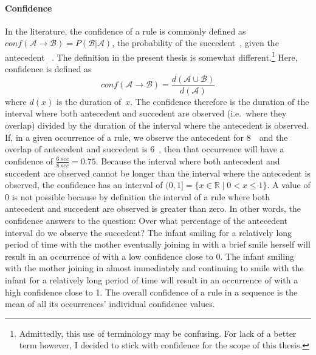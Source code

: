 \paragraph{Confidence}
In the literature, the confidence of a rule  is commonly defined as \(conf(\mathcal{A\rightarrow B}) = P(\mathcal{B|A})\), the probability of the succedent~, given the antecedent~ \citep[]{han_data_2012}.
The definition in the present thesis is somewhat different.\footnote{%
Admittedly, this use of terminology may be confusing. For lack of a better term however, I decided to stick with confidence for the scope of this thesis.}
Here, confidence is defined as
\[conf(\mathcal{A \rightarrow B}) = \frac{d(\mathcal{A \cup B})}{d(\mathcal{A})}\]
where \(d(x)\) is the duration of~\(x\).
The confidence therefore is the duration of the interval where both antecedent and succedent are observed (i.e.~where they overlap) divided by the duration of the interval where the antecedent is observed.
If, in a given occurrence of a rule, we observe the antecedent for 8~\s\ and the overlap of antecedent and succedent is 6~\s, then that occurrence will have a confidence of \(\frac{6~sec}{8~sec} = 0.75\).
Because the interval where both antecedent and succedent are observed cannot be longer than the interval where the antecedent is observed, the confidence has an interval of \((0, 1] = \{x \in \mathbb{R} \mid 0 < x \leq 1 \}\).
A value of \(0\) is not possible because by definition the interval of a rule where both antecedent and succedent are observed is greater than zero.
In other words, the confidence answers to the question:
Over what percentage of the antecedent interval do we observe the succedent?
The infant smiling for a relatively long period of time with the mother eventually joining in with a brief smile herself will result in an occurrence of  with a low confidence close to 0.
The infant smiling with the mother joining in almost immediately and continuing to smile with the infant for a relatively long period of time will result in an occurrence of  with a high confidence close to 1.
The overall confidence of a rule in a sequence is the mean of all its occurrences' individual confidence values.

